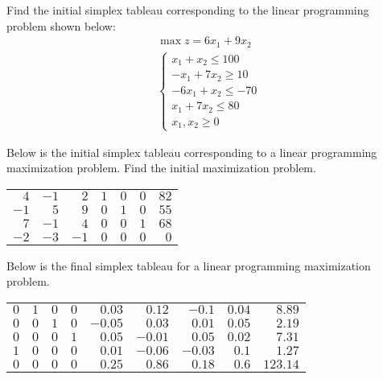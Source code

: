 \documentclass[11pt,letterpaper]{article}
\begin{document}

 Find the initial simplex tableau corresponding to the linear programming problem shown below:
	\[
	\begin{gathered}
	\max z= 6x_1 + 9 x_2 \\
	\begin{cases}
	x_1 + x_2 \leq 100 \\
	-x_1 + 7x_2 \geq 10 \\
	-6x_1 + x_2 \leq -70 \\
	x_1 + 7x_2 \leq 80 \\
	x_1, x_2 \geq 0
	\end{cases}
	\end{gathered}
	\]



\newpage



 Below is the initial simplex tableau corresponding to a linear programming maximization problem. Find the initial maximization problem. \par
	\begin{table}[H]
	\centering
	\begin{tabular}{rrrrrrr}
	$4$ & $-1$ & $2$ & $1$ & $0$ & $0$ & $82$ \\
	$-1$ & $5$ & $9$ & $0$ & $1$ & $0$ & $55$ \\
	$7$ & $-1$ & $4$ & $0$ & $0$ & $1$ & $68$ \\
	$-2$ & $-3$ & $-1$ & $0$ & $0$ & $0$ & $0$ 
	\end{tabular}
	\end{table}



\newpage



 Below is the final simplex tableau for a linear programming maximization problem. \par
	\begin{table}[H]
	\centering
	\begin{tabular}{rrrrrrrrr}
	$0$ & $1$ & $0$ & $0$ & $0.03$ & $0.12$ & $-0.1$ & $0.04$ & $8.89$ \\
	$0$ & $0$ & $1$ & $0$ & $-0.05$ & $0.03$ & $0.01$ & $0.05$ & $2.19$ \\
	$0$ & $0$ & $0$ & $1$ & $0.05$ & $-0.01$ & $0.05$ & $0.02$ & $7.31$ \\
	$1$ & $0$ & $0$ & $0$ & $0.01$ & $-0.06$ & $-0.03$ & $0.1$ & $1.27$ \\
	$0$ & $0$ & $0$ & $0$ & $0.25$ & $0.86$ & $0.18$ & $0.6$ & $123.14$
	\end{tabular}
	\end{table}
\end{document}
